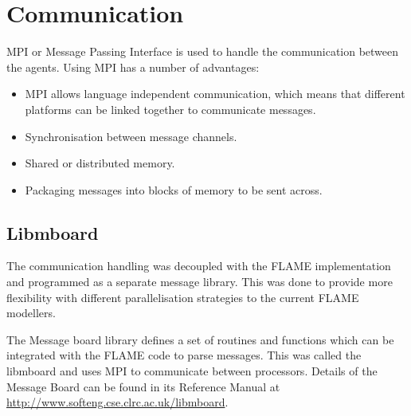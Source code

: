 \section{Communication}

MPI or Message Passing Interface is used to handle the communication between the agents. Using MPI has a number of advantages:

\begin{itemize}
\item MPI allows language independent communication, which means that different platforms can be linked together to communicate messages.
\item Synchronisation between message channels.
\item Shared or distributed memory.
\item Packaging messages into blocks of memory to be sent across.
\end{itemize}


\subsection{Libmboard}
The communication handling was decoupled with the FLAME
implementation and programmed as a separate message library. This
was done to provide more flexibility with different parallelisation
strategies to the current FLAME modellers.

The Message board library defines a set of routines and functions
which can be integrated with the FLAME code to parse messages. This
was called the libmboard and uses MPI to communicate between
processors. Details of the Message Board can be found in its
Reference Manual at
\url{http://www.softeng.cse.clrc.ac.uk/libmboard}.

